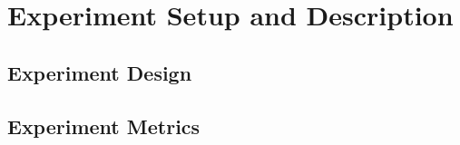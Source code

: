 \chapter{Experiment Setup and Description}
\label{chap:kapitel4}

	
	
	\section{Experiment Design}
	\label{sec:experiment-design}
	
	
	
	\section{Experiment Metrics}
	\label{sec:experiment-metrics}
	
	
	
	
	


